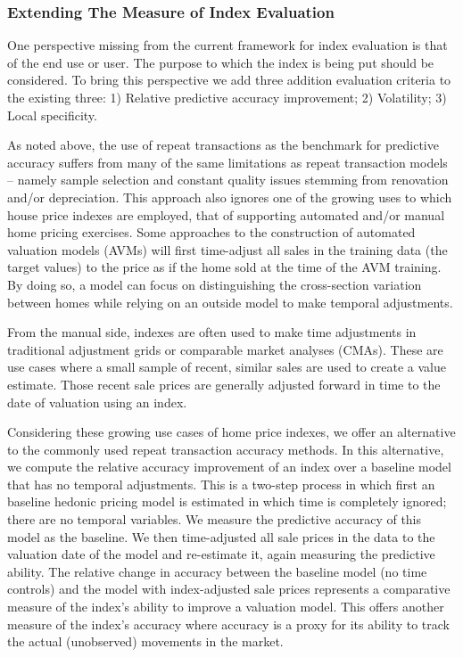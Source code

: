 \documentclass[
]{article}
\begin{document}
\hypertarget{extending-the-measure-of-index-evaluation}{%
\subsubsection{Extending The Measure of Index
Evaluation}\label{extending-the-measure-of-index-evaluation}}

One perspective missing from the current framework for index evaluation
is that of the end use or user. The purpose to which the index is being
put should be considered. To bring this perspective we add three
addition evaluation criteria to the existing three: 1) Relative
predictive accuracy improvement; 2) Volatility; 3) Local specificity.

As noted above, the use of repeat transactions as the benchmark for
predictive accuracy suffers from many of the same limitations as repeat
transaction models -- namely sample selection and constant quality
issues stemming from renovation and/or depreciation. This approach also
ignores one of the growing uses to which house price indexes are
employed, that of supporting automated and/or manual home pricing
exercises. Some approaches to the construction of automated valuation
models (AVMs) will first time-adjust all sales in the training data (the
target values) to the price as if the home sold at the time of the AVM
training. By doing so, a model can focus on distinguishing the
cross-section variation between homes while relying on an outside model
to make temporal adjustments.

From the manual side, indexes are often used to make time adjustments in
traditional adjustment grids or comparable market analyses (CMAs). These
are use cases where a small sample of recent, similar sales are used to
create a value estimate. Those recent sale prices are generally adjusted
forward in time to the date of valuation using an index.

Considering these growing use cases of home price indexes, we offer an
alternative to the commonly used repeat transaction accuracy methods. In
this alternative, we compute the relative accuracy improvement of an
index over a baseline model that has no temporal adjustments. This is a
two-step process in which first an baseline hedonic pricing model is
estimated in which time is completely ignored; there are no temporal
variables. We measure the predictive accuracy of this model as the
baseline. We then time-adjusted all sale prices in the data to the
valuation date of the model and re-estimate it, again measuring the
predictive ability. The relative change in accuracy between the baseline
model (no time controls) and the model with index-adjusted sale prices
represents a comparative measure of the index's ability to improve a
valuation model. This offers another measure of the index's accuracy
where accuracy is a proxy for its ability to track the actual
(unobserved) movements in the market.
\end{document}
